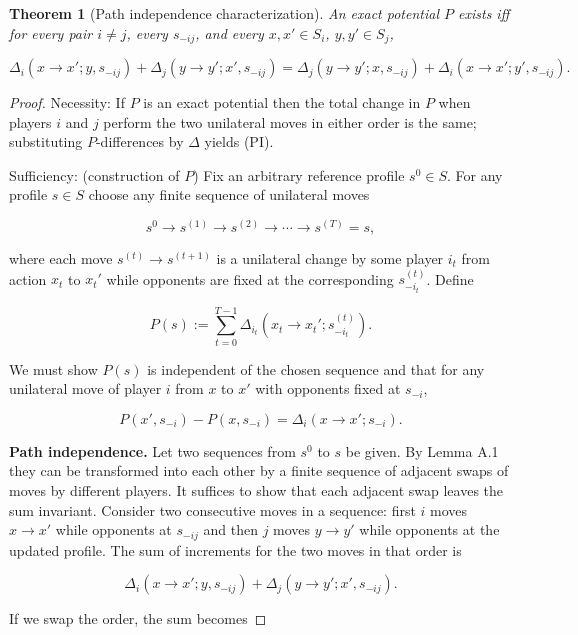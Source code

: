 \documentclass[11pt]{article}
\newtheorem{theorem}{Theorem}[section]
\begin{document}
\begin{theorem}[Path independence characterization]
\label{thm:PI}
An exact potential \(P\) exists iff for every pair \(i\ne j\), every
\(s_{-ij}\), and every \(x,x'\in S_i\), \(y,y'\in S_j\),


\[
\Delta_i(x\to x';y,s_{-ij})+\Delta_j(y\to y';x',s_{-ij})
=\Delta_j(y\to y';x,s_{-ij})+\Delta_i(x\to x';y',s_{-ij}).
\tag{PI}
\]


\end{theorem}

\begin{proof}
Necessity: If \(P\) is an exact potential then the total change in \(P\) when
players \(i\) and \(j\) perform the two unilateral moves in either order is
the same; substituting \(P\)-differences by \(\Delta\) yields (PI).



Sufficiency: (construction of \(P\))
Fix an arbitrary reference profile \(s^0\in S\). For any profile \(s\in S\)
choose any finite sequence of unilateral moves


\[
s^0 \to s^{(1)} \to s^{(2)} \to \cdots \to s^{(T)} = s,
\]


where each move \(s^{(t)}\to s^{(t+1)}\) is a unilateral change by some
player \(i_t\) from action \(x_t\) to \(x_t'\) while opponents are fixed at
the corresponding \(s^{(t)}_{-i_t}\). Define


\[
P(s) := \sum_{t=0}^{T-1} \Delta_{i_t}(x_t\to x_t'; s^{(t)}_{-i_t}).
\]


We must show \(P(s)\) is independent of the chosen sequence and that for any
unilateral move of player \(i\) from \(x\) to \(x'\) with opponents fixed at
\(s_{-i}\),


\[
P(x',s_{-i})-P(x,s_{-i}) = \Delta_i(x\to x'; s_{-i}).
\]



\textbf{Path independence.} Let two sequences from \(s^0\) to \(s\) be given.
By Lemma A.1 they can be transformed into each other by a finite sequence of
adjacent swaps of moves by different players. It suffices to show that each
adjacent swap leaves the sum invariant. Consider two consecutive moves in a
sequence: first \(i\) moves \(x\to x'\) while opponents at \(s_{-ij}\) and
then \(j\) moves \(y\to y'\) while opponents at the updated profile. The
sum of increments for the two moves in that order is


\[
\Delta_i(x\to x'; y, s_{-ij}) + \Delta_j(y\to y'; x', s_{-ij}).
\]


If we swap the order, the sum becomes



\end{proof}
\end{document}
